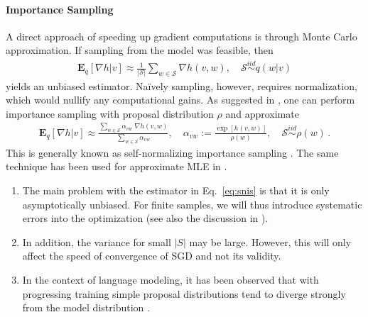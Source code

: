 \documentclass{article}
\newcommand{\E}{{\mathbf E}}
\renewcommand{\S}{{\mathcal S}}
\begin{document}
\paragraph{Importance Sampling} A direct approach of speeding up gradient computations is through Monte Carlo approximation. If sampling from the model was feasible, then
\begin{align}
\E_q \left[ \nabla h |  v \right]  \approx \frac 1{|\S|} \sum_{w \in \S} \nabla h(v,w), \quad \S \stackrel{iid}\sim q(w|v)
\end{align}
yields an unbiased estimator. Na\"ively sampling, however, requires normalization, which would nullify any computational gains. As suggested in \cite{bengio2003quick}, one can perform  importance sampling with proposal distribution $\rho$ and approximate
\begin{align}
\E_q\left[ \nabla h |v\right] \approx   \frac{\sum_{w \in \S}  \alpha_{vw}\; \nabla h(v,w)}{\sum_{w \in \S} \alpha_{vw}}, \quad \alpha_{vw} := \frac{\exp[h(v,w)]}{\rho(w)}, \quad \S \stackrel{iid}\sim \rho(w)\,.
\label{eq:snis}
\end{align}
This is generally known as self-normalizing importance sampling \cite[Chapter 9]{owen2013monte}. The same technique has been used for approximate MLE in \cite[Eq.~(21)]{gutmann2012noise}.

\begin{enumerate}
\item The main problem with the estimator in Eq.~\eqref{eq:snis} is that it is only asymptotically unbiased. For finite samples, we will thus introduce systematic errors into the optimization (see also the discussion in \cite[Section 2.2]{bengio2003quick}).
\item In addition, the variance for small $|S|$ may be large. However, this will only affect the speed of convergence of SGD and not its validity. 
\item In the context of language modeling, it has been observed that with progressing training simple proposal distributions tend to diverge strongly from the model distribution \cite[Section 2.3]{mnih2012fast}.   
\end{enumerate}
\end{document}
